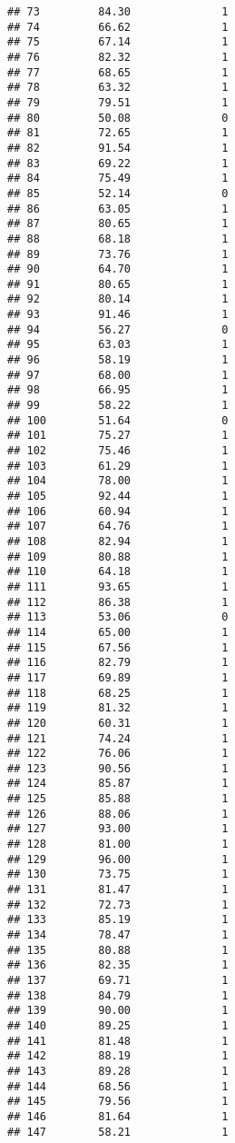 \documentclass[
]{article}
\begin{document}
\begin{verbatim}
## 73         84.30              1
## 74         66.62              1
## 75         67.14              1
## 76         82.32              1
## 77         68.65              1
## 78         63.32              1
## 79         79.51              1
## 80         50.08              0
## 81         72.65              1
## 82         91.54              1
## 83         69.22              1
## 84         75.49              1
## 85         52.14              0
## 86         63.05              1
## 87         80.65              1
## 88         68.18              1
## 89         73.76              1
## 90         64.70              1
## 91         80.65              1
## 92         80.14              1
## 93         91.46              1
## 94         56.27              0
## 95         63.03              1
## 96         58.19              1
## 97         68.00              1
## 98         66.95              1
## 99         58.22              1
## 100        51.64              0
## 101        75.27              1
## 102        75.46              1
## 103        61.29              1
## 104        78.00              1
## 105        92.44              1
## 106        60.94              1
## 107        64.76              1
## 108        82.94              1
## 109        80.88              1
## 110        64.18              1
## 111        93.65              1
## 112        86.38              1
## 113        53.06              0
## 114        65.00              1
## 115        67.56              1
## 116        82.79              1
## 117        69.89              1
## 118        68.25              1
## 119        81.32              1
## 120        60.31              1
## 121        74.24              1
## 122        76.06              1
## 123        90.56              1
## 124        85.87              1
## 125        85.88              1
## 126        88.06              1
## 127        93.00              1
## 128        81.00              1
## 129        96.00              1
## 130        73.75              1
## 131        81.47              1
## 132        72.73              1
## 133        85.19              1
## 134        78.47              1
## 135        80.88              1
## 136        82.35              1
## 137        69.71              1
## 138        84.79              1
## 139        90.00              1
## 140        89.25              1
## 141        81.48              1
## 142        88.19              1
## 143        89.28              1
## 144        68.56              1
## 145        79.56              1
## 146        81.64              1
## 147        58.21              1

\end{verbatim}
\end{document}
